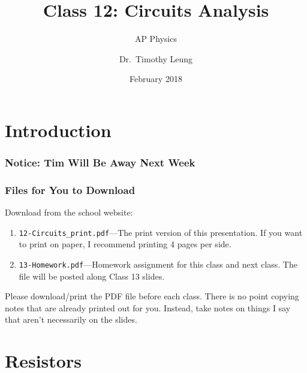 \documentclass[12pt,aspectratio=169]{beamer}
\title{Class 12: Circuits Analysis}
\subtitle{AP Physics}
\author[TML]{Dr.\ Timothy Leung}
\institute{Olympiads School}
\date{February 2018}
\begin{document}
\begin{frame}
  \maketitle
\end{frame}


\section[Intro]{Introduction}

\begin{frame}
  \frametitle{Notice: Tim Will Be Away Next Week}

  \begin{center}
  \end{center}
\end{frame}

\begin{frame}
  \frametitle{Files for You to Download}
  Download from the school website:
  \begin{enumerate}
  \item\texttt{12-Circuits\_print.pdf}---The print version of this
    presentation. If you want to print on paper, I recommend printing 4 pages
    per side.
  \item\texttt{13-Homework.pdf}---Homework assignment for this class and next
    class. The file will be posted along Class 13 slides.
  \end{enumerate}

  \vspace{.2in}Please download/print the PDF file before each class. There is
  no point copying notes that are already printed out for you. Instead, take
  notes on things I say that aren't necessarily on the slides.
\end{frame}



\section{Resistors}
\end{document}

